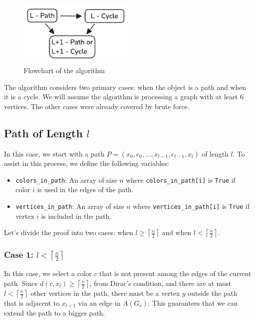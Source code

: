 \begin{figure}[H]
    \centering
    \includegraphics[width=0.5\textwidth]{figuras/flowchart.png}
    \caption{Flowchart of the algorithm}
    \label{fig:flowchart}
\end{figure}

The algorithm considers two primary cases: when the object is a path and when it is a cycle. We will assume the algorithm is processing a graph with at
least $6$ vertices. The other cases were already covered by brute force.

\subsection{Path of Length \( l \)}

In this case, we start with a path \( P = (x_0, e_0, \dots, x_{l-1}, e_{l-1}, x_{l}) \) of length \( l \). 
To assist in this process, we define the following variables:

\begin{itemize}
    \item \texttt{colors\_in\_path}: An array of size \( n \) where \texttt{colors\_in\_path[i]} is \texttt{True} if color \( i \) is used in the edges of the path.
    \item \texttt{vertices\_in\_path}: An array of size \( n \) where \texttt{vertices\_in\_path[i]} is \texttt{True} if vertex \( i \) is included in the path.
\end{itemize}

Let's divide the proof into two cases: when \( l \geq \left \lceil \frac{n}{2} \right \rceil \) and when \( l < \left \lceil \frac{n}{2} \right \rceil \).

\subsubsection{Case 1: \( l < \left \lceil \frac{n}{2} \right \rceil \)}

In this case, we select a color \( c \) that is not present among 
the edges of the current path. Since 
\( d(c, x_{l}) \geq \left \lceil \frac{n}{2} \right \rceil \), from Dirac's condition, 
and there are at most 
\( l < \left \lceil \frac{n}{2} \right \rceil \)
other vertices in the path, there must be a vertex 
\( y \) 
outside the path that is adjacent to 
\( x_{l + 1} \) via an edge in \( A(G_c) \). 
This guarantees that we can extend the path to a bigger path.

